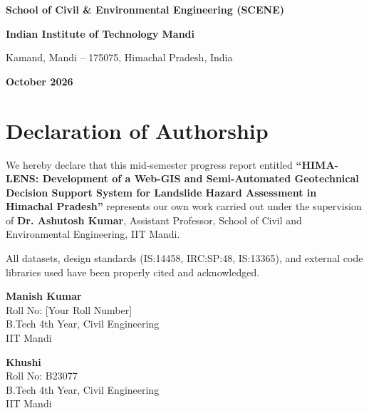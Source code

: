 \documentclass[12pt,a4paper]{report}
\begin{document}
\begin{titlepage}
\vspace{1.5cm}

{\large \textbf{School of Civil \& Environmental Engineering (SCENE)}\par}
{\large \textbf{Indian Institute of Technology Mandi}\par}
{\normalsize Kamand, Mandi -- 175075, Himachal Pradesh, India\par}
\vspace{0.3cm}
{\normalsize \textbf{October 2026}\par}

\end{titlepage}

\setcounter{page}{1}

\chapter*{Declaration of Authorship}

We hereby declare that this mid-semester progress report entitled \textbf{``HIMA-LENS: Development of a Web-GIS and Semi-Automated Geotechnical Decision Support System for Landslide Hazard Assessment in Himachal Pradesh''} represents our own work carried out under the supervision of \textbf{Dr. Ashutosh Kumar}, Assistant Professor, School of Civil and Environmental Engineering, IIT Mandi.

All datasets, design standards (IS:14458, IRC:SP:48, IS:13365), and external code libraries used have been properly cited and acknowledged.

\vspace{2.5cm}

\noindent
\begin{minipage}[t]{0.45\textwidth}
\textbf{Manish Kumar}\\
Roll No: [Your Roll Number]\\
B.Tech 4th Year, Civil Engineering\\
IIT Mandi
\end{minipage}
\hfill
\begin{minipage}[t]{0.45\textwidth}
\textbf{Khushi}\\
Roll No: B23077\\
B.Tech 4th Year, Civil Engineering\\
IIT Mandi
\end{minipage}
\end{document}
